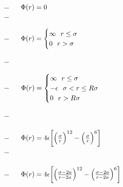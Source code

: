 
\begin{mdframed}
    \vspace*{\baselineskip}
  
    ~~
    
    \tab $-$ ~~ $\pot(\pos) = 0 $ \\
    
    \tab $-$ ~~  \\
    

    \tab $-$ ~~ $\pot(\pos)=\begin{cases}
                    \infty ~~\pos \leq \molecrad\\
                    0 ~~ \pos > \molecrad\\
                \end{cases}$

    \tab $-$ ~~  \\
    
    
    \tab $-$ ~~ $\pot(\pos)=\begin{cases}
                    \infty ~~\pos \leq \molecrad\\
                    -\dielec ~~\molecrad < \pos \leq R\molecrad\\
                    0 ~~ \pos > R\molecrad\\
                \end{cases}$
                
    \tab $-$ ~~  \\
    
    \\
    
    \tab $-$ ~~ $\pot(\pos) = 4\dielec\bigg[\Big(\frac{\molecrad}{\pos}\Big)^{12}-\Big(\frac{\molecrad}{\pos}\Big)^6\bigg] $ \\
    
    \tab $-$ ~~  \\
    
    \\
    
    \tab $-$ ~~ $\pot(\pos) = 4\dielec\bigg[\Big(\frac{\molecrad-2\activity}{\pos-2\activity}\Big)^{12}-\Big(\frac{\molecrad-2\activity}{\pos-2\activity}\Big)^6\bigg] $ \\
    

\end{mdframed}
